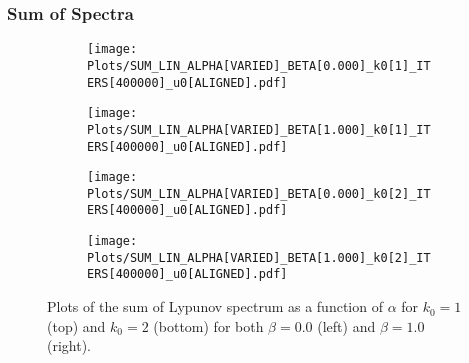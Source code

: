 \documentclass[9pt]{article}
\begin{document}
\subsubsection*{Sum of Spectra}
\begin{figure}[h!]
	\centering
  \begin{subfigure}[b]{0.49\linewidth}
    \texttt{[image: Plots/SUM\_LIN\_ALPHA[VARIED]\_BETA[0.000]\_k0[1]\_ITERS[400000]\_u0[ALIGNED].pdf]}
    \caption{}
  \end{subfigure}
  \begin{subfigure}[b]{0.49\linewidth}
    \texttt{[image: Plots/SUM\_LIN\_ALPHA[VARIED]\_BETA[1.000]\_k0[1]\_ITERS[400000]\_u0[ALIGNED].pdf]}
    \caption{}
  \end{subfigure}
  \begin{subfigure}[b]{0.49\linewidth}
    \texttt{[image: Plots/SUM\_LIN\_ALPHA[VARIED]\_BETA[0.000]\_k0[2]\_ITERS[400000]\_u0[ALIGNED].pdf]}
    \caption{}
  \end{subfigure}
  \begin{subfigure}[b]{0.49\linewidth}
    \texttt{[image: Plots/SUM\_LIN\_ALPHA[VARIED]\_BETA[1.000]\_k0[2]\_ITERS[400000]\_u0[ALIGNED].pdf]}
    \caption{}
  \end{subfigure}
  \caption{Plots of the sum of Lypunov spectrum as a function of $\alpha$ for $k_0 = 1$ (top) and $k_0 = 2$ (bottom) for both $\beta = 0.0$ (left) and $\beta = 1.0$ (right).}
  \label{fig:2}
\end{figure}

\newpage
\end{document}
